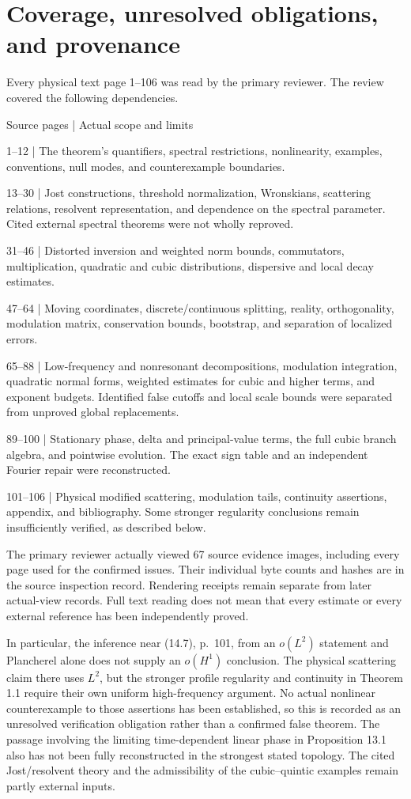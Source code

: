 \documentclass[10pt]{article}
\begin{document}
\section*{Coverage, unresolved obligations, and provenance}
Every physical text page 1–106 was read by the primary reviewer. The review covered the following dependencies.\par
Source pages | Actual scope and limits\par
1–12 | The theorem’s quantifiers, spectral restrictions, nonlinearity, examples, conventions, null modes, and counterexample boundaries.\par
13–30 | Jost constructions, threshold normalization, Wronskians, scattering relations, resolvent representation, and dependence on the spectral parameter. Cited external spectral theorems were not wholly reproved.\par
31–46 | Distorted inversion and weighted norm bounds, commutators, multiplication, quadratic and cubic distributions, dispersive and local decay estimates.\par
47–64 | Moving coordinates, discrete/continuous splitting, reality, orthogonality, modulation matrix, conservation bounds, bootstrap, and separation of localized errors.\par
65–88 | Low-frequency and nonresonant decompositions, modulation integration, quadratic normal forms, weighted estimates for cubic and higher terms, and exponent budgets. Identified false cutoffs and local scale bounds were separated from unproved global replacements.\par
89–100 | Stationary phase, delta and principal-value terms, the full cubic branch algebra, and pointwise evolution. The exact sign table and an independent Fourier repair were reconstructed.\par
101–106 | Physical modified scattering, modulation tails, continuity assertions, appendix, and bibliography. Some stronger regularity conclusions remain insufficiently verified, as described below.\par
The primary reviewer actually viewed 67 source evidence images, including every page used for the confirmed issues. Their individual byte counts and hashes are in the source inspection record. Rendering receipts remain separate from later actual-view records. Full text reading does not mean that every estimate or every external reference has been independently proved.\par
In particular, the inference near (14.7), p. 101, from an \(o(L^2)\) statement and Plancherel alone does not supply an \(o(H^1)\) conclusion. The physical scattering claim there uses \(L^2\), but the stronger profile regularity and continuity in Theorem 1.1 require their own uniform high-frequency argument. No actual nonlinear counterexample to those assertions has been established, so this is recorded as an unresolved verification obligation rather than a confirmed false theorem. The passage involving the limiting time-dependent linear phase in Proposition 13.1 also has not been fully reconstructed in the strongest stated topology. The cited Jost/resolvent theory and the admissibility of the cubic–quintic examples remain partly external inputs.\par
\end{document}
